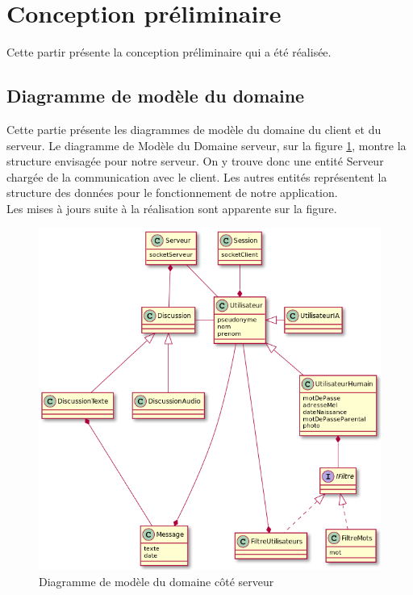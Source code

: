 \section{Conception préliminaire}

Cette partir présente la conception préliminaire qui a été réalisée.

	\subsection{Diagramme de modèle du domaine}
	Cette partie présente les diagrammes de modèle du domaine du client et du serveur.
	Le diagramme de Modèle du Domaine serveur, sur la figure \ref{diagModeleServeur}, montre la structure envisagée pour notre serveur.
	On y trouve donc une entité Serveur chargée de la communication avec le client.
	Les autres entités représentent la structure des données pour le fonctionnement de notre application.\\
	
	Les mises à jours suite à la réalisation sont apparente sur la figure.

	\begin{figure}[H]
	\centerline{\includegraphics[width=16.5cm]{img/modeleDomaineServeur.png}}
	\caption{\label{diagModeleServeur}Diagramme de modèle du domaine côté serveur}
	\end{figure}


